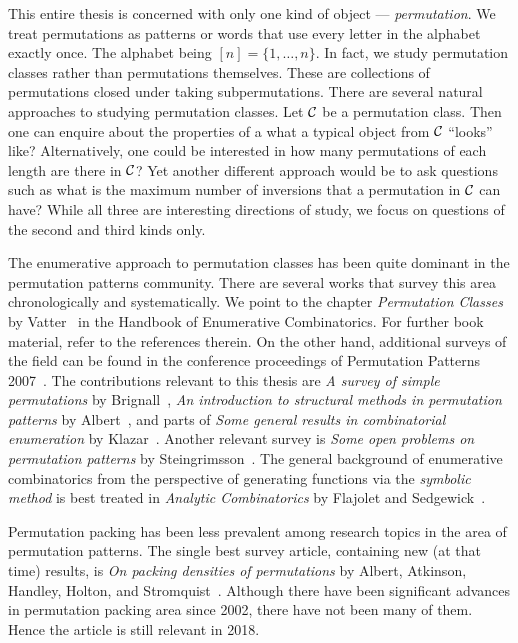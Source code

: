 \documentclass[12pt, a4paper, twoside]{report}
\begin{document}
This entire thesis is concerned with only one kind of object --- \emph{permutation}. We treat permutations as patterns or words that use every letter in the alphabet exactly once. The alphabet being $[n] = \{1,\ldots,n\}$. In fact, we study permutation classes rather than permutations themselves. These are collections of permutations closed under taking subpermutations. There are several natural approaches to studying permutation classes. Let $\mathcal{C}$ be a permutation class. Then one can enquire about the properties of a what a typical object from $\mathcal{C}$ ``looks'' like? Alternatively, one could be interested in how many permutations of each length are there in $\mathcal{C}$? Yet another different approach would be to ask questions such as what is the maximum number of inversions that a permutation in $\mathcal{C}$ can have? While all three are interesting directions of study, we focus on questions of the second and third kinds only.

The enumerative approach to permutation classes has been quite dominant in the permutation patterns community. There are several works that survey this area chronologically and systematically. We point to the chapter \emph{Permutation Classes} by Vatter~\cite{vatterhandbook} in the Handbook of Enumerative Combinatorics. For further book material, refer to the references therein. On the other hand, additional surveys of the field can be found in the conference proceedings of Permutation Patterns 2007~\cite{lintonruskucvatter}. The contributions relevant to this thesis are \emph{A survey of simple permutations} by Brignall~\cite{brignallsimple}, \emph{An introduction to structural methods in permutation patterns} by Albert~\cite{albertstructural}, and parts of \emph{Some general results in combinatorial enumeration} by Klazar~\cite{klazargeneral}. Another relevant survey is \emph{Some open problems on permutation patterns} by Steingrimsson~\cite{einar2012openproblems}. The general background of enumerative combinatorics from the perspective of generating functions via the \emph{symbolic method} is best treated in \emph{Analytic Combinatorics} by Flajolet and Sedgewick~\cite{analcomb}.

Permutation packing has been less prevalent among research topics in the area of permutation patterns. The single best survey article, containing new (at that time) results, is \emph{On packing densities of permutations} by Albert, Atkinson, Handley, Holton, and Stromquist~\cite{albert2002packing}. Although there have been significant advances in permutation packing area since 2002, there have not been many of them. Hence the article is still relevant in 2018.
\end{document}
